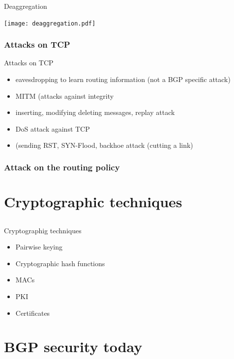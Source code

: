 \documentclass[notes=hide,yellow]{beamer}
\begin{document}
\begin{frame}{Deaggregation}
	\begin{center}
		\texttt{[image: deaggregation.pdf]}
	\end{center}
\end{frame}

\begin{frame}
	\frametitle{Attacks on TCP}
	
	\begin{block}{Attacks on TCP}
	\begin{itemize}
		\item eavesdropping to learn routing information (not a BGP specific attack)
		\item MITM (attacks against integrity
		\item inserting, modifying deleting messages, replay attack
		\item DoS attack against TCP
		\item (sending RST, SYN-Flood, backhoe attack (cutting a link)
	\end{itemize}
	\end{block}

\end{frame}


\begin{frame}
	\frametitle{Attack on the routing policy}
\end{frame}

\section{Cryptographic techniques}
\subsection*{}
\begin{frame}{Cryptographig techniques}
\begin{itemize}
	\item Pairwise keying
	\item Cryptographic hash functions
	\item MACs
	\item PKI
	\item Certificates
\end{itemize}
\end{frame}

\section{BGP security today}
\end{document}
